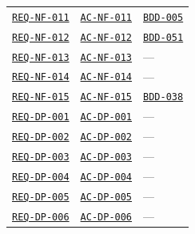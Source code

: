 \documentclass[11pt,a4paper]{article}
\begin{document}
\begin{longtable}{p{3.1cm} p{3.0cm} >{\raggedright\arraybackslash}p{9.1cm}}
\hyperlink{REQ-NF-011}{\texttt{REQ-NF-011}} & \hyperlink{AC-NF-011}{\texttt{AC-NF-011}} & \hyperlink{BDD-005}{\texttt{BDD-005}} \\
\hyperlink{REQ-NF-012}{\texttt{REQ-NF-012}} & \hyperlink{AC-NF-012}{\texttt{AC-NF-012}} & \hyperlink{BDD-051}{\texttt{BDD-051}} \\
\hyperlink{REQ-NF-013}{\texttt{REQ-NF-013}} & \hyperlink{AC-NF-013}{\texttt{AC-NF-013}} & — \\
\hyperlink{REQ-NF-014}{\texttt{REQ-NF-014}} & \hyperlink{AC-NF-014}{\texttt{AC-NF-014}} & — \\
\hyperlink{REQ-NF-015}{\texttt{REQ-NF-015}} & \hyperlink{AC-NF-015}{\texttt{AC-NF-015}} & \hyperlink{BDD-038}{\texttt{BDD-038}} \\
\hyperlink{REQ-DP-001}{\texttt{REQ-DP-001}} & \hyperlink{AC-DP-001}{\texttt{AC-DP-001}} & — \\
\hyperlink{REQ-DP-002}{\texttt{REQ-DP-002}} & \hyperlink{AC-DP-002}{\texttt{AC-DP-002}} & — \\
\hyperlink{REQ-DP-003}{\texttt{REQ-DP-003}} & \hyperlink{AC-DP-003}{\texttt{AC-DP-003}} & — \\
\hyperlink{REQ-DP-004}{\texttt{REQ-DP-004}} & \hyperlink{AC-DP-004}{\texttt{AC-DP-004}} & — \\
\hyperlink{REQ-DP-005}{\texttt{REQ-DP-005}} & \hyperlink{AC-DP-005}{\texttt{AC-DP-005}} & — \\
\hyperlink{REQ-DP-006}{\texttt{REQ-DP-006}} & \hyperlink{AC-DP-006}{\texttt{AC-DP-006}} & — \\
\end{longtable}
\normalsize
\end{document}
